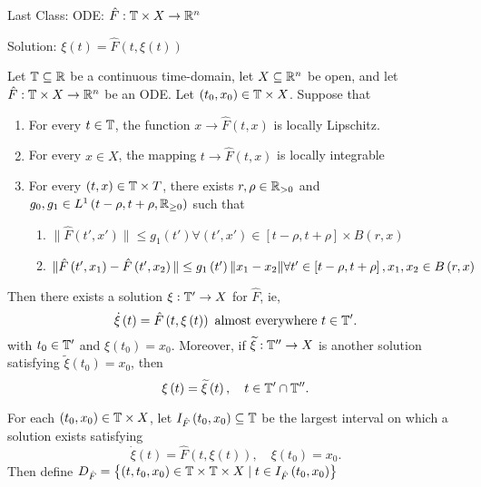 
Last Class: ODE: $\hat{F} : \mathbb{T} \times X \to \mathbb{R}^{n}$

Solution: $\xi \left( t \right)  = \hat{F}\left( t, \xi \left( t \right)  \right) $

\begin{theorem}
	Let $\mathbb{T} \subseteq \mathbb{R}$ be a continuous time-domain, let  $X \subseteq \mathbb{R}^{n}$ be open, and let $\hat{F} : \mathbb{T}\times X \to \mathbb{R}^{n}$ be an ODE. Let $\left( t_0, x_0 \right) \in  \mathbb{T} \times  X$. Suppose that
	\begin{enumerate}
		\item For every $t \in  \mathbb{T}$, the function $x \to \hat{F}\left( t, x \right)  $ is locally Lipschitz. 
		\item For every $x \in  X $, the mapping $t \to \hat{F}\left( t,x \right) $ is locally integrable
		\item For every $\left( t, x  \right) \in  \mathbb{T} \times  T$, there exists $r, \rho \in \mathbb{R}_{>0}$ and $g_0, g_1 \in \\ L^{1}\left( t - \rho, t + \rho, \mathbb{R} _{\ge 0} \right) $ such that 
			\begin{enumerate}
				\item $\|\hat{F}\left( t', x' \right) \| \le g_{1 }\left( t' \right) \forall \left( t', x' \right) \in \left[ t - \rho, t + \rho \right] \times B\left( r, x \right) $ 
				\item $\|\hat{F}\left( t', x_1  \right) - \hat{F}\left( t', x_2 \right) \| \le g_{1}\left( t' \right)  \|x_1 - x_2\| \forall  t' \in \left[ t - \rho, t + \rho \right] , \\ x_1, x_2 \in  B\left( r, x \right) $
			\end{enumerate}
	\end{enumerate}

	Then there exists a solution $\xi  : \mathbb{T}' \to X$ for $\hat{F}$, ie, 
	\[
		\dot{\xi } \left( t \right)  = \hat{F}\left( t, \xi \left( t \right)  \right)  \text{ almost everywhere } t \in  \mathbb{T}'
	.\] 
	with $t_{0}\in \mathbb{T}'$ and $\xi \left( t_0 \right)  = x_0$. Moreover, if $\widetilde{\xi }  : \mathbb{T}'' \to X$ is another solution satisfying $\widetilde{\xi }\left( t_0 \right)  = x_0$, then 
	\[
		\xi \left( t \right)  = \widetilde{\xi }\left( t \right) , \quad t \in  \mathbb{T}' \cap  \mathbb{T}''	.\] 
\end{theorem}

For each $\left( t_0, x_0 \right) \in  \mathbb{T} \times  X$, let $I  _{\hat{F}}\left( t_0, x_0 \right) \subseteq \mathbb{T}$ be the largest interval on which a solution exists satisfying 
		\[
			\dot{\xi }\left( t \right)  = \hat{F}\left( t, \xi \left( t \right)  \right) , \quad \xi \left( t_0 \right)  = x_0
		.\] 
		Then define $D_{\hat{F}} = \left\{ \left( t, t_0, x_0 \right)  \in \mathbb{T}\times \mathbb{T}\times X  \mid t \in  I_{\hat{F}}\left( t_0, x_0 \right)  \right\} $

